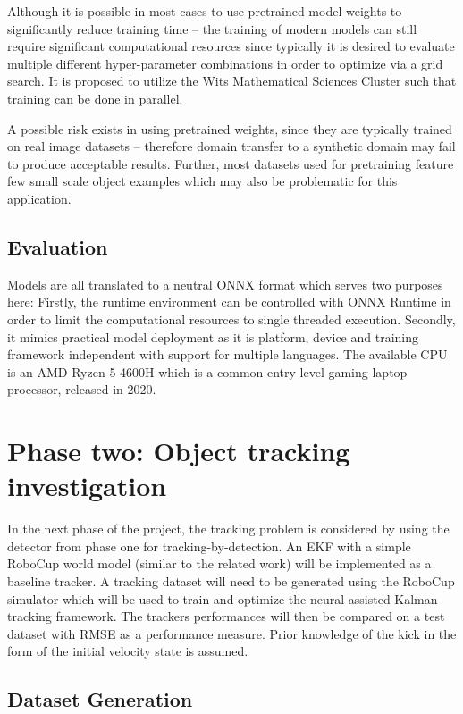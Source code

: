\documentclass[a4paper,twoside,12pt]{report}
\begin{document}
Although it is possible in most cases to use pretrained model weights to significantly reduce training time -- the training of modern models can still require significant computational resources since typically it is desired to evaluate multiple different hyper-parameter combinations in order to optimize via a grid search. It is proposed to utilize the Wits Mathematical Sciences Cluster such that training can be done in parallel.  

A possible risk exists in using pretrained weights, since they are typically trained on real image datasets -- therefore domain transfer to a synthetic domain may fail to produce acceptable results. Further, most datasets used for pretraining feature few small scale object examples which may also be problematic for this application.

\subsection{Evaluation}
Models are all translated to a neutral ONNX format which serves two purposes here: Firstly, the runtime environment can be controlled with ONNX Runtime in order to limit the computational resources to single threaded execution. Secondly, it mimics practical model deployment as it is platform, device and training framework independent with support for multiple languages. The available CPU is an AMD Ryzen 5 4600H which is a common entry level gaming laptop processor, released in 2020. 

\section{Phase two: Object tracking investigation}

In the next phase of the project, the tracking problem is considered by using the detector from phase one for tracking-by-detection. An EKF with a simple RoboCup world model (similar to the related work) will be implemented as a baseline tracker. A tracking dataset will need to be generated using the RoboCup simulator which will be used to train and optimize the neural assisted Kalman tracking framework. The trackers performances will then be compared on a test dataset with RMSE as a performance measure. Prior knowledge of the kick in the form of the initial velocity state is assumed.

\subsection{Dataset Generation}
\end{document}
